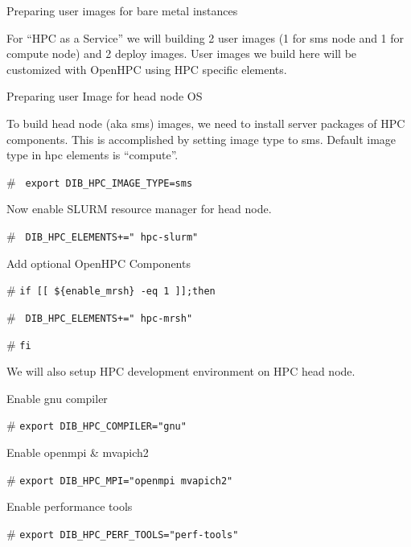 \documentclass[12pt]{article}
\begin{document}
Preparing user images for bare metal instances

For “HPC as a Service” we will building 2 user images (1 for sms node and 1 for compute node) and 2 deploy images. User images we build here will be customized with OpenHPC using HPC specific elements. 


Preparing user Image for head node OS

To build head node (aka sms) images, we need to install server packages of HPC components. This is accomplished by setting image type to sms. Default image type in hpc elements is “compute”.

\begin{bash}[ctrlr]\# \texttt{\small{ export DIB\_HPC\_IMAGE\_TYPE=sms}}\end{bash}

Now enable SLURM resource manager for head node.

\begin{bash}[ctrlr]\# \texttt{\small{ DIB\_HPC\_ELEMENTS+=" hpc-slurm"}}\end{bash}

Add optional OpenHPC Components

\begin{bash}[ctrlr]\# \texttt{\small{if [[ \$\{enable\_mrsh\} -eq 1 ]];then}}\end{bash}
\begin{bash}[ctrlr]\# \texttt{\small{       DIB\_HPC\_ELEMENTS+=" hpc-mrsh"}}\end{bash}
\begin{bash}[ctrlr]\# \texttt{\small{fi}}\end{bash}

We will also setup HPC development environment on HPC head node. 

Enable gnu compiler

\begin{bash}[ctrlr]\# \texttt{\small{export DIB\_HPC\_COMPILER="gnu"}}\end{bash}

Enable openmpi \& mvapich2

\begin{bash}[ctrlr]\# \texttt{\small{export DIB\_HPC\_MPI="openmpi mvapich2"}}\end{bash}

Enable performance tools

\begin{bash}[ctrlr]\# \texttt{\small{export DIB\_HPC\_PERF\_TOOLS="perf-tools"}}\end{bash}
\end{document}
